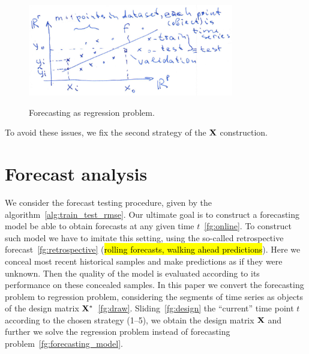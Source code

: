 \documentclass[12pt]{article}
\begin{document}
\begin{figure}[!ht]
\centering\includegraphics[width=0.8\textwidth]{forecasting_model.png}
\label{fg:forecasting}
\caption{Forecasting as regression problem.}
\end{figure}

To avoid these issues, we fix the second strategy of the ${\mathbf{X}}$ construction.
\section{Forecast analysis}
We consider the forecast testing procedure, given by the algorithm~\ref{alg:train_test_rmse}.
Our ultimate goal is to construct a forecasting model be able to obtain forecasts at any given time $t$~\ref{fg:online}. To construct such model we have to imitate this setting, using the so-called retrospective forecast~\ref{fg:retrospective} (\hl{rolling forecasts, walking ahead predictions}). Here we conceal most recent historical samples and make predictions as if they were unknown. Then the quality of the model is evaluated according to its performance on these concealed samples. In this paper we convert the forecasting problem to regression problem,  considering the segments of time series as objects of the design matrix ${\mathbf{X}}^{*}$~\ref{fg:draw}. Sliding~\ref{fg:design} the ``current'' time point $t$ according to the chosen strategy (1--5), we obtain the design matrix ${\mathbf{X}}$ and further we solve the regression problem instead of forecasting problem~\ref{fg:forecasting_model}.
\end{document}
